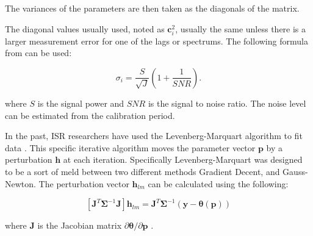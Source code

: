 \noindent  The variances of the parameters are then taken as the diagonals of the matrix. 

%
%



The diagonal values usually used, noted as $\mathbf{c}_i^2$, usually the same unless there is a larger measurement error for one of the lags or spectrums. The following formula from  \cite{nicollsisrschool2013} can be used:

\begin{equation}
\label{sigpow}
\sigma_i = \frac{S}{\sqrt{J}}\left(1+\frac{1}{SNR}\right).
\end{equation}

\noindent where $S$ is the signal power and $SNR$ is the signal to noise ratio. The noise level can be estimated from the calibration period. 

In the past, ISR researchers have used the Levenberg-Marquart algorithm to fit data \cite{nikoukar2008}. This specific iterative algorithm moves the parameter vector $\mathbf{p}$ by a perturbation $\mathbf{h}$ at each iteration\cite{gavin:2013}. Specifically Levenberg-Marquart was designed to be a sort of meld between two different methods Gradient Decent, and Gauss-Newton. The perturbation vector $\mathbf{h}_{lm}$ can be calculated using the following:

\begin{equation}
\left[ \mathbf{J}^T\bm{\Sigma}^{-1}\mathbf{J}\right]\mathbf{h}_{lm} =\mathbf{J}^T\bm{\Sigma}^{-1}(\mathbf{y}-\bm{\theta}(\mathbf{p}))
\label{hlm}
\end{equation}

\noindent where $\mathbf{J}$ is the Jacobian matrix $\partial \bm{\theta}/\partial \mathbf{p}$ \cite{levenberg1944,marquardt:1963}. 

